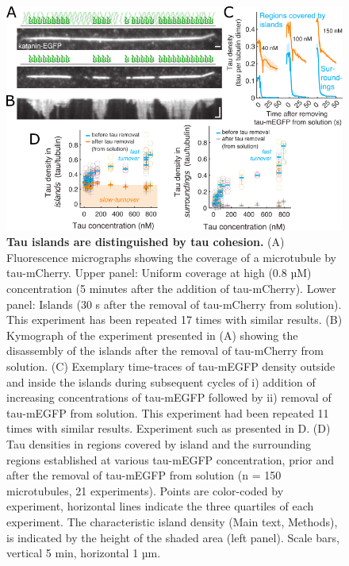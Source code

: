 \begin{figure}[h!]
\centering
\includegraphics[scale=0.7]{Figures/tau5.png}
\caption[Tau islands are distinguished by tau cohesion.]{
\textbf{Tau islands are distinguished by tau cohesion.} (A) Fluorescence micrographs showing the coverage of a microtubule by tau-mCherry. Upper panel: Uniform coverage at high (0.8 µM) concentration (5 minutes after the addition of tau-mCherry). Lower panel: Islands (30 s after the removal of tau-mCherry from solution). This experiment has been repeated 17 times with similar results. (B) Kymograph of the experiment presented in (A) showing the disassembly of the islands after the removal of tau-mCherry from solution. (C) Exemplary time-traces of tau-mEGFP density outside and inside the islands during subsequent cycles of i) addition of increasing concentrations of tau-mEGFP followed by ii) removal of tau-mEGFP from solution. This experiment had been repeated 11 times with similar results. Experiment such as presented in D. (D) Tau densities in regions covered by island and the surrounding regions established at various tau-mEGFP concentration, prior and after the removal of tau-mEGFP from solution (n = 150 microtubules, 21 experiments). Points are color-coded by experiment, horizontal lines indicate the three quartiles of each experiment. The characteristic island density (Main text, Methods), is indicated by the height of the shaded area (left panel). Scale bars, vertical 5 min, horizontal 1 µm.
	}\label{tau5}
\end{figure}
